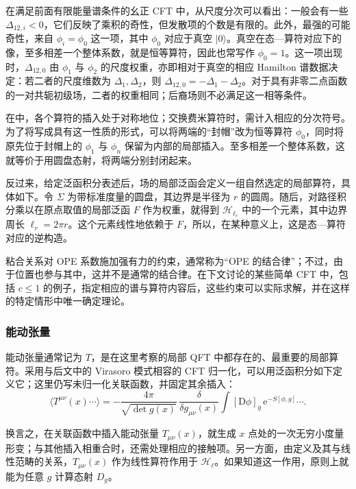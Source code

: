 在满足前面有限能量谱条件的幺正 CFT 中，从尺度分次可以看出：一般会有一些 $\Delta_{12,i}<0$，它们反映了乘积的奇性，但发散项的个数是有限的。此外，最强的可能奇性，来自 $\phi_i=\phi_0$ 这一项，其中 $\phi_0$ 对应于真空 $|0\rangle$。真空在态—算符对应下的像，至多相差一个整体系数，就是恒等算符，因此也常写作 $\phi_0=1$。这一项出现时，$\Delta_{12,0}$ 由 $\phi_1$ 与 $\phi_2$ 的尺度权重，亦即相对于真空的相应 Hamilton 谱数据决定：若二者的尺度维数为 $\Delta_1,\Delta_2$，则 $\Delta_{12,0}=-\Delta_1-\Delta_2$。对于具有非零二点函数的一对共轭初级场，二者的权重相同；后裔场则不必满足这一相等条件。

在中，各个算符的插入处于对称地位；交换费米算符时，需计入相应的分次符号。为了将写成具有这一性质的形式，可以将两端的“封帽”改为恒等算符 $\phi_0$，同时将原先位于封帽上的 $\phi_1$ 与 $\phi_n$ 保留为内部的局部插入。至多相差一个整体系数，这就等价于用圆盘态射，将两端分别封闭起来。

反过来，给定泛函积分表述后，场的局部泛函会定义一组自然选定的局部算符，具体如下。令 $\Sigma$ 为带标准度量的圆盘，其边界是半径为 $r$ 的圆周。随后，对路径积分乘以在原点取值的局部泛函 $F$ 作为权重，就得到 $\mathcal{H}_{\ell_r}$ 中的一个元素，其中边界周长 $\ell_r=2\pi r$。这个元素线性地依赖于 $F$，所以，在某种意义上，这是态—算符对应的逆构造。

粘合关系对 OPE 系数施加强有力的约束，通常称为“OPE 的结合律”；不过，由于位置也参与其中，这并不是通常的结合律。在下文讨论的某些简单 CFT 中，包括 $c\le1$ 的例子，指定相应的谱与算符内容后，这些约束可以实际求解，并在这样的特定情形中唯一确定理论。

\subsubsection{能动张量}\label{sec:3.2.1.3}

\begin{definition*}\label{def:3.stress-tensor}
能动张量通常记为 $T$，是在这里考察的局部 QFT 中都存在的、最重要的局部算符。采用与后文中的 Virasoro 模式相容的 CFT 归一化，可以用泛函积分如下定义它；这里仍写未归一化关联函数，并固定其余插入：
\begin{equation}\label{eq:3.27}
\bigl\langle T^{\mu\nu}(x)\cdots\bigr\rangle
=-\frac{4\pi}{\sqrt{\det g(x)}}\,
\frac{\delta}{\delta g_{\mu\nu}(x)}
\int[\mathrm{D}\phi]_g\,\mathrm{e}^{-S[\phi,g]}\cdots.
\end{equation}
\end{definition*}
换言之，在关联函数中插入能动张量 $T_{\mu\nu}(x)$，就生成 $x$ 点处的一次无穷小度量形变；与其他插入相重合时，还需处理相应的接触项。另一方面，由定义及其与线性范畴的关系，$T_{\mu\nu}(x)$ 作为线性算符作用于 $\mathcal{H}_\ell$。如果知道这一作用，原则上就能为任意 $g$ 计算态射 $D_g$。

